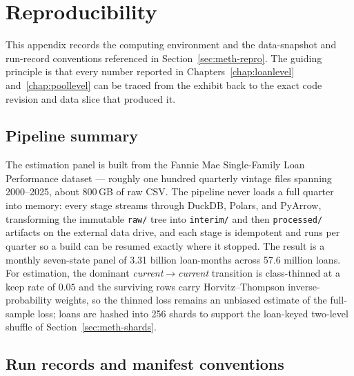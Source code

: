 %

\chapter{Reproducibility}
\label{app:reproducibility}

This appendix records the computing environment and the data-snapshot
and run-record conventions referenced in
Section~\ref{sec:meth-repro}. The guiding principle is that every
number reported in Chapters~\ref{chap:loanlevel}
and~\ref{chap:poollevel} can be traced from the
exhibit back to the exact code revision and data slice that produced
it.

\section{Pipeline summary}
\label{sec:repro-pipeline}

The estimation panel is built from the Fannie Mae Single-Family Loan
Performance dataset --- roughly one hundred quarterly vintage files
spanning 2000--2025, about 800\,GB of raw CSV. The pipeline never loads
a full quarter into memory: every stage streams through DuckDB, Polars,
and PyArrow, transforming the immutable \texttt{raw/} tree into
\texttt{interim/} and then \texttt{processed/} artifacts on the external
data drive, and each stage is idempotent and runs per quarter so a
build can be resumed exactly where it stopped. The result is a monthly
seven-state panel of 3.31 billion loan-months across 57.6 million
loans. For estimation, the dominant \emph{current}$\to$\emph{current}
transition is class-thinned at a keep rate of $0.05$ and the surviving
rows carry Horvitz--Thompson inverse-probability weights, so the thinned
loss remains an unbiased estimate of the full-sample loss; loans are
hashed into 256 shards to support the loan-keyed two-level shuffle of
Section~\ref{sec:meth-shards}.

\section{Run records and manifest conventions}
\label{sec:repro-records}

